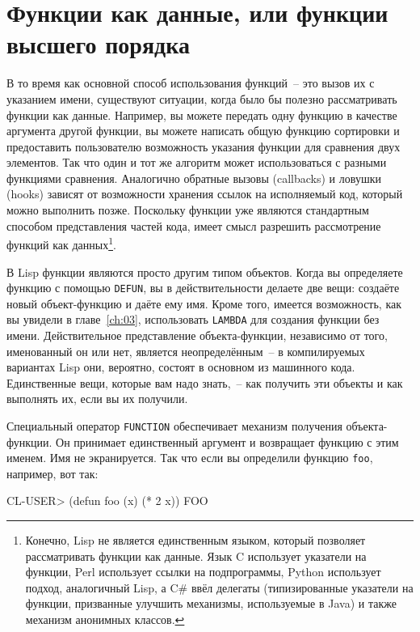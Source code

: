\section{Функции как данные, или функции высшего порядка}

В то время как основной способ использования функций~-- это вызов их с указанием имени,
существуют ситуации, когда было бы полезно рассматривать функции как данные.  Например, вы
можете передать одну функцию в качестве аргумента другой функции, вы можете написать общую
функцию сортировки и предоставить пользователю возможность указания функции для сравнения
двух элементов.  Так что один и тот же алгоритм может использоваться с разными функциями
сравнения.  Аналогично обратные вызовы (callbacks) и ловушки (hooks) зависят от
возможности хранения ссылок на исполняемый код, который можно выполнить позже.  Поскольку
функции уже являются стандартным способом представления частей кода, имеет смысл разрешить
рассмотрение функций как данных\footnote{Конечно, Lisp не является единственным языком,
  который позволяет рассматривать функции как данные.  Язык C использует указатели на
  функции, Perl использует ссылки на подпрограммы, Python использует подход, аналогичный
  Lisp, а C\# ввёл делегаты (типизированные указатели на функции, призванные улучшить
  механизмы, используемые в Java) и также механизм анонимных классов.}.

В Lisp функции являются просто другим типом объектов.  Когда вы определяете функцию с
помощью \lstinline{DEFUN}, вы в действительности делаете две вещи: создаёте новый
объект-функцию и даёте ему имя.  Кроме того, имеется возможность, как вы увидели в
главе~\ref{ch:03}, использовать \lstinline{LAMBDA} для создания функции без имени.
Действительное представление объекта-функции, независимо от того, именованный он или нет,
является неопределённым~-- в компилируемых вариантах Lisp они, вероятно, состоят в
основном из машинного кода.  Единственные вещи, которые вам надо знать,~-- как получить
эти объекты и как выполнять их, если вы их получили.

Специальный оператор \lstinline{FUNCTION} обеспечивает механизм получения объекта-функции.  Он
принимает единственный аргумент и возвращает функцию с этим именем.  Имя не экранируется.
Так что если вы определили функцию \lstinline{foo}, например, вот так:

\begin{myverb}
CL-USER> (defun foo (x) (* 2 x))
FOO
\end{myverb}

